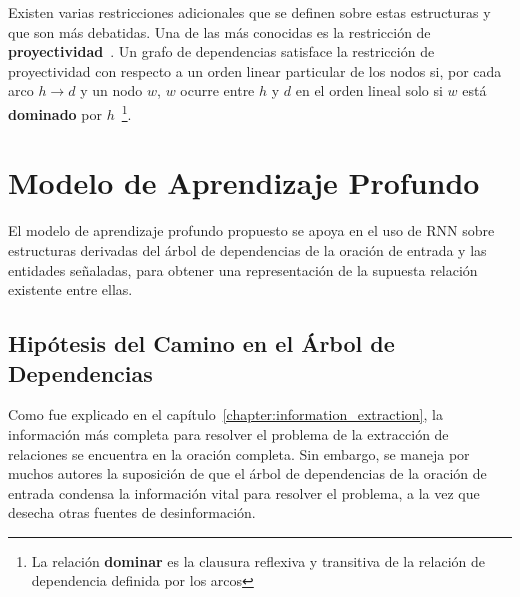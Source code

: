 Existen varias restricciones adicionales que se definen sobre estas estructuras y que son más debatidas.
Una de las más conocidas es la restricción de \textbf{proyectividad}~\cite{hays1964dependency,lecerf1960programme,marcus1965notion}.
Un grafo de dependencias satisface la restricción de proyectividad con respecto a un orden linear particular de los nodos si, por cada arco $h \rightarrow d$ y un nodo $w$, $w$ ocurre entre $h$ y $d$ en el orden lineal solo si $w$ está \textbf{dominado} por $h$~\footnote{La relación \textbf{dominar} es la clausura reflexiva y transitiva de la relación de dependencia definida por los arcos}. 

\section{Modelo de Aprendizaje Profundo}\label{sec:model}

El modelo de aprendizaje profundo propuesto se apoya en el uso de RNN sobre estructuras derivadas del árbol de dependencias de la oración de entrada y las entidades señaladas, para obtener una representación de la supuesta relación existente entre ellas.

\subsection{Hipótesis del Camino en el Árbol de Dependencias}

Como fue explicado en el capítulo~\ref{chapter:information_extraction}, la información más completa para resolver el problema de la extracción de relaciones se encuentra en la oración completa. Sin embargo, se maneja por muchos autores la suposición de que el árbol de dependencias de la oración de entrada condensa la información vital para resolver el problema, a la vez que desecha otras fuentes de desinformación.

